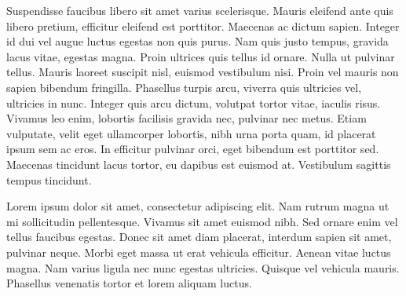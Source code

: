 Suspendisse faucibus libero sit amet varius scelerisque. Mauris eleifend ante quis libero pretium, efficitur eleifend est porttitor. Maecenas ac dictum sapien. Integer id dui vel augue luctus egestas non quis purus. Nam quis justo tempus, gravida lacus vitae, egestas magna. Proin ultrices quis tellus id ornare. Nulla ut pulvinar tellus. Mauris laoreet suscipit nisl, euismod vestibulum nisi. Proin vel mauris non sapien bibendum fringilla. Phasellus turpis arcu, viverra quis ultricies vel, ultricies in nunc. Integer quis arcu dictum, volutpat tortor vitae, iaculis risus. Vivamus leo enim, lobortis facilisis gravida nec, pulvinar nec metus. Etiam vulputate, velit eget ullamcorper lobortis, nibh urna porta quam, id placerat ipsum sem ac eros. In efficitur pulvinar orci, eget bibendum est porttitor sed. Maecenas tincidunt lacus tortor, eu dapibus est euismod at. Vestibulum sagittis tempus tincidunt. 

Lorem ipsum dolor sit amet, consectetur adipiscing elit. Nam rutrum magna ut mi sollicitudin pellentesque. Vivamus sit amet euismod nibh. Sed ornare enim vel tellus faucibus egestas. Donec sit amet diam placerat, interdum sapien sit amet, pulvinar neque. Morbi eget massa ut erat vehicula efficitur. Aenean vitae luctus magna. Nam varius ligula nec nunc egestas ultricies. Quisque vel vehicula mauris. Phasellus venenatis tortor et lorem aliquam luctus.